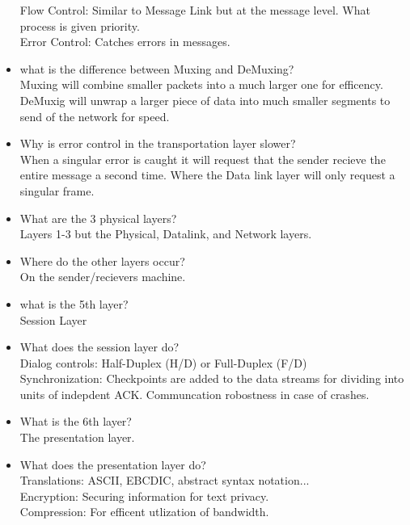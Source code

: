 \begin{itemize}
    Flow Control: Similar to Message Link but at the message level. What process is given priority.\\

    Error Control: Catches errors in messages.\\


    \item what is the difference between Muxing and DeMuxing?\\
    Muxing will combine smaller packets into a much larger one for efficency.\\
    DeMuxig will unwrap a larger piece of data into much smaller segments to 
    send of the network for speed.\\

    \item Why is error control in the transportation layer slower?\\
    When a singular error is caught it will request that the sender recieve the entire 
    message a second time. Where the Data link layer will only request a singular frame.


    \item What are the 3 physical layers?\\
    Layers 1-3 but the Physical, Datalink, and Network layers.\\

    \item Where do the other layers occur?\\
    On the sender/recievers machine.

    \item what is the 5th layer?\\
    Session Layer

    \item What does the session layer do?\\
    Dialog controls: Half-Duplex (H/D) or Full-Duplex (F/D)\\
    Synchronization: Checkpoints are added to the data streams for dividing into units
    of indepdent ACK. Communcation robostness in case of crashes.\\


    \item What is the 6th layer?\\
    The presentation layer.\\

    \item What does the presentation layer do?\\
    Translations: ASCII, EBCDIC, abstract syntax notation...\\
    Encryption: Securing information for text privacy.\\
    Compression: For efficent utlization of bandwidth.\\


\end{itemize}
